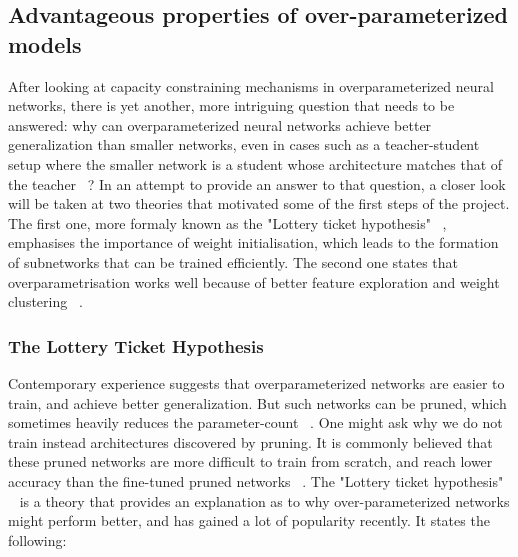 \subsection{Advantageous properties of over-parameterized models}
After looking at capacity constraining mechanisms in overparameterized neural networks, there is yet another, more intriguing question that needs to be answered: why can overparameterized neural networks achieve better generalization than smaller networks, even in cases such as a teacher-student setup where the smaller network is a student whose architecture matches that of the teacher ~\autocite{tian2019luck}? In an attempt to provide an answer to that question, a closer look will be taken at two theories that motivated some of the first steps of the project. The first one, more formaly known as the "Lottery ticket hypothesis" ~\autocite{frankle2018lottery}, emphasises the importance of weight initialisation, which leads to the formation of subnetworks that can be trained efficiently. The second one states that overparametrisation works well because of better feature exploration and weight clustering ~\autocite{brutzkus2019larger}.


\subsubsection*{The Lottery Ticket Hypothesis}
Contemporary experience suggests that overparameterized networks are easier to train, and achieve better generalization. But such networks can be pruned, which sometimes heavily reduces the parameter-count ~\autocite{han2015learning}. One might ask why we do not train instead architectures discovered by pruning. It is commonly believed that these pruned networks are more difficult to train from scratch, and reach lower accuracy than the fine-tuned pruned networks ~\autocite{li2016pruning}. The "Lottery ticket hypothesis" ~\autocite{frankle2018lottery} is a theory that provides an explanation as to why over-parameterized networks might perform better, and has gained a lot of popularity recently. It states the following: \\

